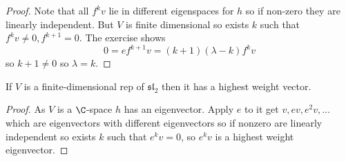 \documentclass[a4paper]{article}
\newcommand*{\Lie}[1]{\mathfrak{#1}} %
\begin{document}
\begin{proof}
  Note that all \(f^k v\) lie in different eigenspaces for \(h\) so if non-zero they are linearly independent. But \(V\) is finite dimensional so exists \(k\) such that \(f^k v \neq 0, f^{k + 1} = 0\). The exercise shows
  \[
    0 = ef^{k + 1}v = (k + 1)( \lambda - k)f^k v
  \]
  so \(k + 1 \neq 0\) so \(\lambda = k\).
\end{proof}

\begin{lemma}
  If \(V\) is a finite-dimensional rep of \(\Lie{sl}_2\) then it has a highest weight vector.
\end{lemma}

\begin{proof}
  As \(V\) is a \(\C\)-space \(h\) has an eigenvector. Apply \(e\) to it get \(v, ev, e^2v, \dots\) which are eigenvectors with different eigenvectors so if nonzero are linearly independent so exists \(k\) such that \(e^kv = 0\), so \(e^kv\) is a highest weight eigenvector.
\end{proof}


\printindex
\end{document}
